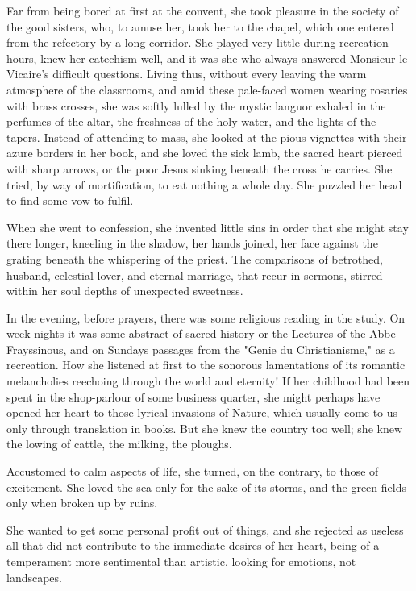 \documentclass[11pt,twocolumn]{ltugboat}
\begin{document}
Far from being bored at first at the convent, she took pleasure in the
society of the good sisters, who, to amuse her, took her to the chapel,
which one entered from the refectory by a long corridor. She played very
little during recreation hours, knew her catechism well, and it was she
who always answered Monsieur le Vicaire's difficult questions. Living
thus, without every leaving the warm atmosphere of the classrooms, and
amid these pale-faced women wearing rosaries with brass crosses, she
was softly lulled by the mystic languor exhaled in the perfumes of the
altar, the freshness of the holy water, and the lights of the tapers.
Instead of attending to mass, she looked at the pious vignettes with
their azure borders in her book, and she loved the sick lamb, the sacred
heart pierced with sharp arrows, or the poor Jesus sinking beneath the
cross he carries. She tried, by way of mortification, to eat nothing a
whole day. She puzzled her head to find some vow to fulfil.

When she went to confession, she invented little sins in order that she
might stay there longer, kneeling in the shadow, her hands joined,
her face against the grating beneath the whispering of the priest.
The comparisons of betrothed, husband, celestial lover, and eternal
marriage, that recur in sermons, stirred within her soul depths of
unexpected sweetness.

In the evening, before prayers, there was some religious reading in
the study. On week-nights it was some abstract of sacred history or
the Lectures of the Abbe Frayssinous, and on Sundays passages from the
"Genie du Christianisme," as a recreation. How she listened at first to
the sonorous lamentations of its romantic melancholies reechoing
through the world and eternity! If her childhood had been spent in the
shop-parlour of some business quarter, she might perhaps have opened
her heart to those lyrical invasions of Nature, which usually come to
us only through translation in books. But she knew the country too well;
she knew the lowing of cattle, the milking, the ploughs.

Accustomed to calm aspects of life, she turned, on the contrary, to
those of excitement. She loved the sea only for the sake of its storms,
and the green fields only when broken up by ruins.

She wanted to get some personal profit out of things, and she rejected
as useless all that did not contribute to the immediate desires of her
heart, being of a temperament more sentimental than artistic, looking
for emotions, not landscapes.
\end{document}
